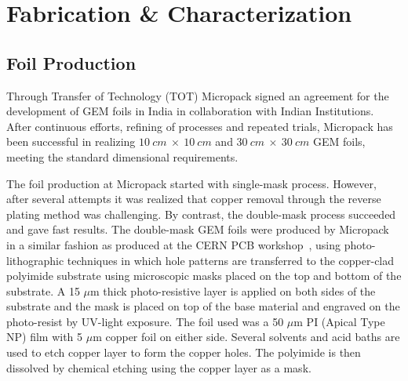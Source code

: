 \section{Fabrication \& Characterization} %
\label{sec:fabrication_&_characterization}
\subsection{Foil Production}
Through Transfer of Technology (TOT) Micropack signed an agreement for the development of GEM foils in India in collaboration with Indian Institutions. After continuous efforts, refining of processes and repeated trials, Micropack has been successful in realizing $10~cm~\times~10~cm$ and $30~cm~\times~30~cm$ GEM foils, meeting the standard dimensional requirements. 


The foil production at Micropack started with single-mask process. However, after several attempts it was realized that copper removal through the reverse plating method was challenging. By contrast, the double-mask process succeeded and gave fast results. The double-mask GEM foils were produced by Micropack in a similar fashion as produced at the CERN PCB workshop~\cite{DEOLIVEIRA2009}, using photo-lithographic techniques in which hole patterns are transferred to the copper-clad polyimide substrate using microscopic masks placed on the top and bottom of the substrate. A 15 $\mu$m thick photo-resistive layer is applied on both sides of the substrate and the mask is placed on top of the base material and engraved on the photo-resist by UV-light exposure. The foil used was a 50 $\mu$m PI (Apical Type NP) film with 5 $\mu$m copper foil on either side. Several solvents and acid baths are used to etch copper layer  to form the copper holes. The polyimide is then dissolved by chemical etching using the copper layer as a mask. 
